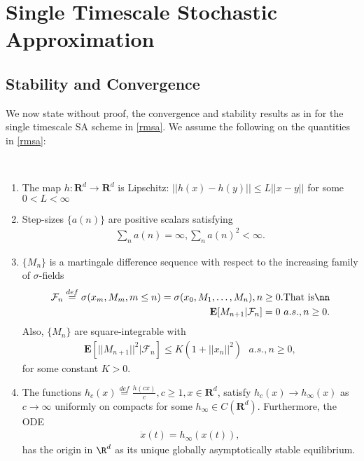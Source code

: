 \section{Single Timescale Stochastic Approximation}\label{stssa}
\subsection{Stability and Convergence}
We now state without proof, the convergence and stability results as in \cite{SA} for the single timescale SA scheme in \eqref{rmsa}. We assume the following on the quantities in \eqref{rmsa}:\\
\begin{assumption}\label{both}
\mbox{ }\\
\begin{enumerate}
\item The map $h \colon \mathbf{R}^d \rightarrow \mathbf{R}^d$ is Lipschitz: $||h(x)-h(y)|| \leq L||x-y||$ for some $0 <L<\infty$
\item Step-sizes $\{a(n)\}$ are positive scalars satisfying
\begin{align}
\sum_n a(n)=\infty,\sum_n a(n)^2<\infty.
\end{align}
\item $\{M_n\}$ is a martingale difference sequence with respect to the increasing family of $\sigma$-fields
\begin{align}
\mathcal{F}_n\stackrel{def}{=}\sigma(x_m,M_m,m\leq n)=\sigma(x_0,M_1,\ldots,M_n), n\geq 0. \text{That is}\nn\\
\mathbf{E}[M_{n+1}|\mathcal{F}_n]=0\mbox{ } a.s., n\geq 0.
\end{align}
Also, $\{M_n\}$ are square-integrable with
\begin{align}
\mathbf{E}[||M_{n+1}||^2|\mathcal{F}_n]\leq K(1+||x_n||^2) \mbox{ } a.s., n\geq0,
\end{align}
for some constant $K>0$.
\item \label{scaleode} The functions $h_c(x)\stackrel{def}{=}\frac{h(cx)}{c}, c\geq 1, x \in \mathbf{R}^d$, satisfy $h_c(x)\rightarrow h_\infty(x)$ as $c\rightarrow \infty$ uniformly on compacts for some $h_\infty \in C(\mathbf{R}^d)$. Furthermore, the ODE
\begin{align}\label{scalestab}
\dot{x}(t)=h_\infty(x(t)),
\end{align}
has the origin in $\R^d$ as its unique globally asymptotically stable equilibrium.
\end{enumerate}
\end{assumption}
